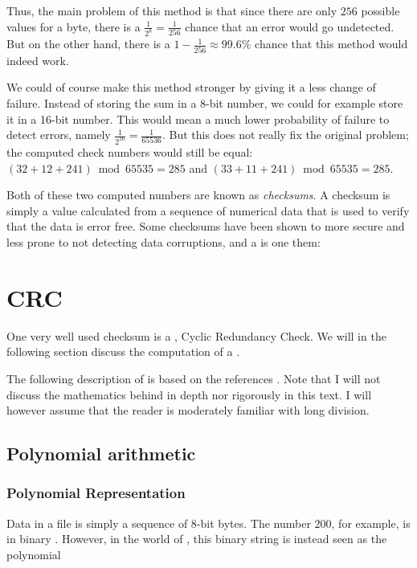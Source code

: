 Thus, the main problem of this method is that since there are only
$256$ possible values for a byte, there is a $\frac{1}{2^8} =
\frac{1}{256}$ chance that an error would go undetected. But on the
other hand, there is a $1 - \frac{1}{256} \approx 99.6\%$ chance that
this method would indeed work.

We could of course make this method stronger by giving it a less
change of failure. Instead of storing the sum in a 8-bit number, we
could for example store it in a 16-bit number. This would mean a much
lower probability of failure to detect errors, namely
$\frac{1}{2^{16}} = \frac{1}{65536}$. But this does not really fix the
original problem; the computed check numbers would still be equal:
$(32 + 12 + 241) \bmod 65535 = 285$ and $(33 + 11 + 241) \bmod 65535 =
285$.

Both of these two computed numbers are known as \textit{checksums}. A
checksum is simply a value calculated from a sequence of numerical
data that is used to verify that the data is error free. Some
checksums have been shown to more secure and less prone to not
detecting data corruptions, and a \crc is one them:

\section{CRC}

One very well used checksum is a \crc, Cyclic Redundancy Check. We will
in the following section discuss the computation of a \crc.

The following description of \crc is based on the references
\cite{Ritter:1986:GCM:12647.12648,Williams_1993_crc_painless,tanenbaum2003computernetworks_crc,Nelson:1992:FVU:135011.135017_crc32,Stigge06reversingcrc,barr:_crc_implem_code_c,black:_fast_crc32_softw,geremia99:_cyclic}. Note
that I will not discuss the mathematics behind \crc in depth nor
rigorously in this text. I will however assume that the reader is
moderately familiar with long division.

\subsection{Polynomial arithmetic}

\subsubsection{Polynomial Representation}

Data in a file is simply a sequence of 8-bit bytes. The number $200$,
for example, is in binary . However, in the world of \crc,
this binary string is instead seen as the polynomial

